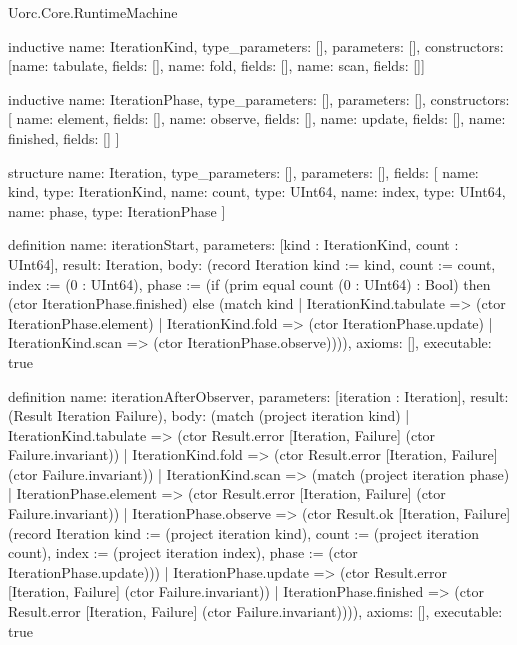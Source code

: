 \begin{lexlean}{Uorc.Core.RuntimeMachine}
\begin{semanticmodule}
inductive{
  name: IterationKind,
  type_parameters: [],
  parameters: [],
  constructors: [{name: tabulate, fields: []}, {name: fold, fields: []}, {name: scan, fields: []}]
}

inductive{
  name: IterationPhase,
  type_parameters: [],
  parameters: [],
  constructors: [
    {name: element, fields: []},
    {name: observe, fields: []},
    {name: update, fields: []},
    {name: finished, fields: []}
  ]
}

structure{
  name: Iteration,
  type_parameters: [],
  parameters: [],
  fields: [
    {name: kind, type: IterationKind},
    {name: count, type: UInt64},
    {name: index, type: UInt64},
    {name: phase, type: IterationPhase}
  ]
}

definition{
  name: iterationStart,
  parameters: [kind : IterationKind, count : UInt64],
  result: Iteration,
  body: (record Iteration {kind := kind, count := count, index := (0 : UInt64), phase := (if (prim equal count (0 : UInt64) : Bool) then (ctor IterationPhase.finished) else (match kind
    | IterationKind.tabulate => (ctor IterationPhase.element)
    | IterationKind.fold => (ctor IterationPhase.update)
    | IterationKind.scan => (ctor IterationPhase.observe)))}),
  axioms: [],
  executable: true
}

definition{
  name: iterationAfterObserver,
  parameters: [iteration : Iteration],
  result: (Result Iteration Failure),
  body: (match (project iteration kind)
    | IterationKind.tabulate => (ctor Result.error [Iteration, Failure] (ctor Failure.invariant))
    | IterationKind.fold => (ctor Result.error [Iteration, Failure] (ctor Failure.invariant))
    | IterationKind.scan => (match (project iteration phase)
      | IterationPhase.element => (ctor Result.error [Iteration, Failure] (ctor Failure.invariant))
      | IterationPhase.observe => (ctor Result.ok [Iteration, Failure] (record Iteration {kind := (project iteration kind), count := (project iteration count), index := (project iteration index), phase := (ctor IterationPhase.update)}))
      | IterationPhase.update => (ctor Result.error [Iteration, Failure] (ctor Failure.invariant))
      | IterationPhase.finished => (ctor Result.error [Iteration, Failure] (ctor Failure.invariant)))),
  axioms: [],
  executable: true
}


\end{semanticmodule}
\end{lexlean}
